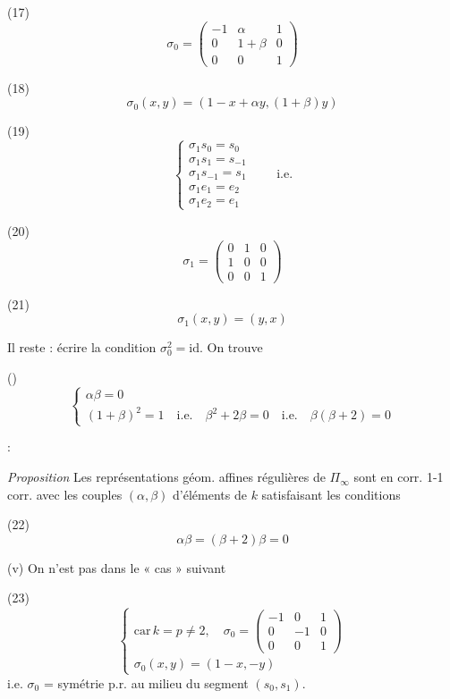 \documentclass[11pt,a4paper]{article}
\begin{document}
(17)
\[
\sigma_0 = \begin{pmatrix} -1 & \alpha & 1 \\ 0 & 1+\beta & 0 \\ 0 & 0 & 1 \end{pmatrix}
\]

(18)
\[
\sigma_0(x,y) = (1 - x + \alpha y, (1+\beta) y)
\]

(19)
\[
\begin{cases}
\sigma_1 s_0 = s_0 \\
\sigma_1 s_1 = s_{-1} \\
\sigma_1 s_{-1} = s_1 \\
\sigma_1 e_1 = e_2 \\
\sigma_1 e_2 = e_1
\end{cases}
\qquad \text{i.e.}
\]

(20)
\[
\sigma_1 = \begin{pmatrix} 0 & 1 & 0 \\ 1 & 0 & 0 \\ 0 & 0 & 1 \end{pmatrix}
\]

(21)
\[
\sigma_1(x,y) = (y,x)
\]

Il reste : écrire la condition $\sigma_0^2 = \mathrm{id}$. On trouve

(\ill{})
\[
\begin{cases}
\boxed{\alpha\beta = 0} \\
(1+\beta)^2 = 1 \quad \text{i.e.} \quad \boxed{\beta^2 + 2\beta = 0} \quad \text{i.e.} \quad \boxed{\beta(\beta+2) = 0}
\end{cases}
\]

 :

\emph{Proposition} Les représentations géom. affines  régulières de $\Pi_\infty$ sont  en corr. 1-1 corr. avec les couples $(\alpha,\beta)$ d'éléments de $k$ satisfaisant les conditions

(22)
\[
\alpha\beta = (\beta+2)\beta = 0
\]

(v) On n'est pas dans le « cas \struck{\ill{}}  » suivant 

(23)
\[
\begin{cases}
\text{car}\, k = p \neq 2, \quad \sigma_0 = \begin{pmatrix} -1 & 0 & 1 \\ 0 & -1 & 0 \\ 0 & 0 & 1 \end{pmatrix} \\
\sigma_0(x,y) = (1-x, -y)
\end{cases}
\]
i.e. $\sigma_0$ = symétrie p.r. au milieu du segment $(s_0, s_1)$.
\end{document}
